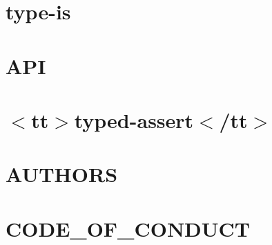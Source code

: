 \documentclass[twoside]{book}
\newcommand{\+}{\discretionary{\mbox{\scriptsize$\hookleftarrow$}}{}{}}
\begin{document}
\chapter{type-\/is}
\label{md__c___users_vaishnavi_jadhav__desktop__developer_code_mean_stack_example_client_node_modules_type_is__r_e_a_d_m_e}

\chapter{API}
\label{md__c___users_vaishnavi_jadhav__desktop__developer_code_mean_stack_example_client_node_modules_typed_assert__a_p_i}

\chapter{\texorpdfstring{$<$}{<}tt\texorpdfstring{$>$}{>}typed-\/assert\texorpdfstring{$<$}{<}/tt\texorpdfstring{$>$}{>}}
\label{md__c___users_vaishnavi_jadhav__desktop__developer_code_mean_stack_example_client_node_modules_typed_assert__r_e_a_d_m_e}

\chapter{AUTHORS}
\label{md__c___users_vaishnavi_jadhav__desktop__developer_code_mean_stack_example_client_node_modules_typescript__a_u_t_h_o_r_s}

\chapter{CODE\+\_\+\+OF\+\_\+\+CONDUCT}
\label{md__c___users_vaishnavi_jadhav__desktop__developer_code_mean_stack_example_client_node_modules_tb8feb94814bc99892a7538a6beabfb3f}

\end{document}
